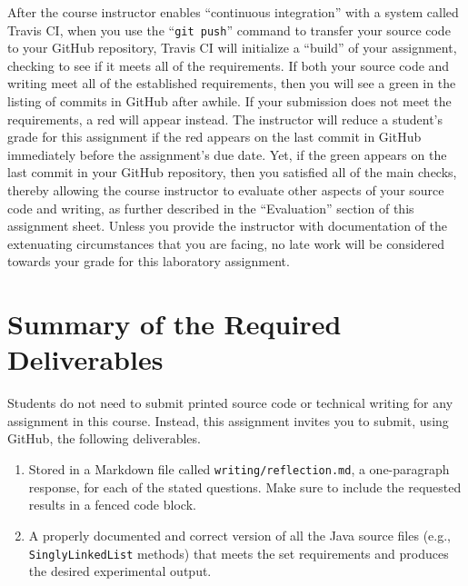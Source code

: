 \documentclass[11pt]{article}
\newcommand{\reflection}{\lstinline{writing/reflection.md}}
\newcommand{\gitpush}{\command{git push}}
\newcommand{\command}[1]{``\lstinline{#1}''}
\newcommand{\program}[1]{\lstinline{#1}}
\newcommand{\step}[1]{``{#1}''}
\newcommand{\checkmark}{\ding{51}}
\newcommand{\naughtmark}{\ding{55}}
\begin{document}
After the course instructor enables \step{continuous integration} with a system
called Travis CI, when you use the \gitpush{} command to transfer your source
code to your GitHub repository, Travis CI will initialize a \step{build} of your
assignment, checking to see if it meets all of the requirements. If both your
source code and writing meet all of the established requirements, then you will
see a green \checkmark{} in the listing of commits in GitHub after awhile. If
your submission does not meet the requirements, a red \naughtmark{} will appear
instead. The instructor will reduce a student's grade for this assignment if the
red \naughtmark{} appears on the last commit in GitHub immediately before the
assignment's due date. Yet, if the green \checkmark{} appears on the last commit
in your GitHub repository, then you satisfied all of the main checks, thereby
allowing the course instructor to evaluate other aspects of your source code and
writing, as further described in the \step{Evaluation} section of this
assignment sheet. Unless you provide the instructor with documentation of the
extenuating circumstances that you are facing, no late work will be considered
towards your grade for this laboratory assignment.

\section*{Summary of the Required Deliverables}

\noindent Students do not need to submit printed source code or technical
writing for any assignment in this course. Instead, this assignment invites you
to submit, using GitHub, the following deliverables.

\vspace*{-.05in}

\begin{enumerate}

  \setlength{\itemsep}{0in}

\item Stored in a Markdown file called \reflection{}, a one-paragraph response,
  for each of the stated questions. Make sure to include the requested results
  in a fenced code block.

\item A properly documented and correct version of all the Java source files
  (e.g., \program{SinglyLinkedList} methods) that meets the set requirements and
  produces the desired experimental output.

\end{enumerate}
\end{document}
